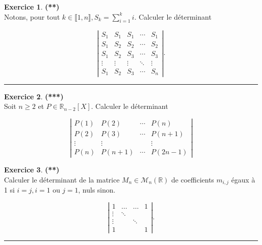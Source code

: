 \documentclass[a4paper,11pt]{article}
\theoremstyle{definition}
\newtheorem{exo}{Exercice} %
\begin{document}
	


\begin{exo}\textbf{(**)}\quad\\[0.25cm]
Notons, pour tout $k \in \llbracket 1, n \rrbracket, S_{k}=\sum_{i=1}^{k} i$. Calculer le déterminant

$$
\left|\begin{array}{ccccc}
S_{1} & S_{1} & S_{1} & \cdots & S_{1} \\
S_{1} & S_{2} & S_{2} & \cdots & S_{2} \\
S_{1} & S_{2} & S_{3} & \cdots & S_{3} \\
\vdots & \vdots & \vdots & \ddots & \vdots \\
S_{1} & S_{2} & S_{3} & \cdots & S_{n}
\end{array}\right| .
$$
	\centering
\rule{1\linewidth}{0.6pt}
\end{exo}

\begin{exo}\textbf{(***)}\quad\\[0.25cm]%

	Soit $n \geq 2$ et $P \in \mathbb{R}_{n-2}[X]$. Calculer le déterminant

$$\left|\begin{array}{cccc}P(1) & P(2) & \cdots & P(n) \\ P(2) & P(3) & \cdots & P(n+1) \\ \vdots & \vdots & & \vdots \\ P(n) & P(n+1) & \cdots & P(2 n-1)\end{array}\right|$$
	
	\centering
\end{exo}


\begin{exo}\textbf{(**)}\quad\\[0.25cm]%
Calculer le déterminant de la matrice $M_{n} \in \mathscr{M}_{n}(\mathbb{R})$ de coefficients $m_{i, j}$ égaux à 1 si $i=j, i=1$ ou $j=1$, nuls sinon.

$$
\left|\begin{array}{cccc}
1 & \ldots & \ldots & 1 \\
\vdots & \ddots & & \\
\vdots & & \ddots & \\
1 & & & 1
\end{array}\right| .
$$
	
	\centering
	\rule{1\linewidth}{0.6pt}
\end{exo}
\end{document}
